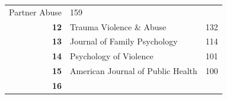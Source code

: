 \documentclass[]{tufte-handout}
\begin{document}
\begin{longtable}[]{@{}rlr@{}}
\begin{minipage}[t]{0.56\columnwidth}
Partner Abuse\strut
\end{minipage} & \begin{minipage}[t]{0.09\columnwidth}\raggedleft\strut
159\strut
\end{minipage}\tabularnewline
\begin{minipage}[t]{0.11\columnwidth}\raggedleft\strut
\textbf{12}\strut
\end{minipage} & \begin{minipage}[t]{0.56\columnwidth}\raggedright\strut
Trauma Violence \& Abuse\strut
\end{minipage} & \begin{minipage}[t]{0.09\columnwidth}\raggedleft\strut
132\strut
\end{minipage}\tabularnewline
\begin{minipage}[t]{0.11\columnwidth}\raggedleft\strut
\textbf{13}\strut
\end{minipage} & \begin{minipage}[t]{0.56\columnwidth}\raggedright\strut
Journal of Family Psychology\strut
\end{minipage} & \begin{minipage}[t]{0.09\columnwidth}\raggedleft\strut
114\strut
\end{minipage}\tabularnewline
\begin{minipage}[t]{0.11\columnwidth}\raggedleft\strut
\textbf{14}\strut
\end{minipage} & \begin{minipage}[t]{0.56\columnwidth}\raggedright\strut
Psychology of Violence\strut
\end{minipage} & \begin{minipage}[t]{0.09\columnwidth}\raggedleft\strut
101\strut
\end{minipage}\tabularnewline
\begin{minipage}[t]{0.11\columnwidth}\raggedleft\strut
\textbf{15}\strut
\end{minipage} & \begin{minipage}[t]{0.56\columnwidth}\raggedright\strut
American Journal of Public Health\strut
\end{minipage} & \begin{minipage}[t]{0.09\columnwidth}\raggedleft\strut
100\strut
\end{minipage}\tabularnewline
\begin{minipage}[t]{0.11\columnwidth}\raggedleft\strut
\textbf{16}\strut
\end{minipage} & \begin{minipage}[t]{0.56\columnwidth}\raggedright\strut

\end{minipage}
\end{longtable}
\end{document}
